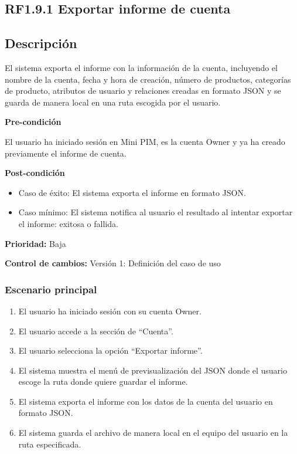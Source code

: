 \subsection*{RF1.9.1 Exportar informe de cuenta}

\subsection*{Descripción}
El sistema exporta el informe con la información de la cuenta, incluyendo el
nombre de la cuenta, fecha y hora de creación, número de productos, categorías 
de producto, atributos de usuario y relaciones creadas en formato JSON y se guarda 
de manera local en una ruta escogida por el usuario.

\vspace{0.15cm}

\textbf{Pre-condición}\par
El usuario ha iniciado sesión en Mini PIM, es la cuenta Owner y ya ha creado previamente el informe de cuenta.\par
\vspace{0.15cm}

\textbf{Post-condición}
\begin{itemize}
    \item Caso de éxito: El sistema exporta el informe en formato JSON. %
    \item Caso mínimo: El sistema notifica al usuario el resultado al intentar exportar el informe: exitosa o fallida.
\end{itemize}

\textbf{Prioridad:}
Baja
\vspace{0.15cm}

\textbf{Control de cambios:} Versión 1: Definición del caso de uso

\subsubsection*{Escenario principal}
\begin{enumerate}
    \item El usuario ha iniciado sesión con su cuenta Owner.
    \item El usuario accede a la sección de \enquote{Cuenta}.
    \item El usuario selecciona la opción \enquote{Exportar informe}.
    \item El sistema muestra el menú de previsualización del JSON donde el usuario escoge la ruta donde quiere guardar el informe.
    \item El sistema exporta el informe con los datos de la cuenta del usuario en formato JSON. %
    \item El sistema guarda el archivo de manera local en el equipo del usuario en la ruta especificada.
\end{enumerate}

